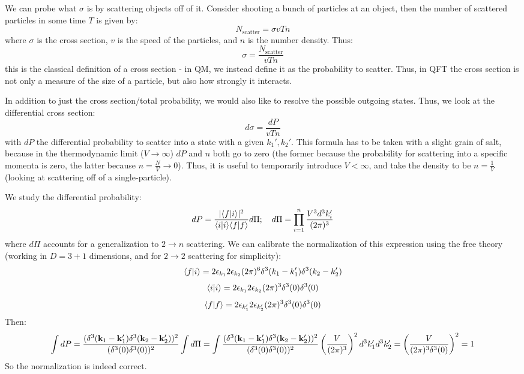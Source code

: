 We can probe what $\sigma$ is by scattering objects off of it. Consider shooting a bunch of particles at an object, then the number of scattered particles in some time $T$ is given by:
\begin{equation}
    N_{\text{scatter}} = \sigma v T n
\end{equation}
where $\sigma$ is the cross section, $v$ is the speed of the particles, and $n$ is the number density. Thus:
\begin{equation}
    \sigma = \frac{N_{\text{scatter}}}{vTn}
\end{equation}
this is the classical definition of a cross section - in QM, we instead define it as the probability to scatter. Thus, in QFT the cross section is not only a measure of the size of a particle, but also how strongly it interacts.

In addition to just the cross section/total probability, we would also like to resolve the possible outgoing states. Thus, we look at the differential cross section:
\begin{equation}
    d\sigma = \frac{dP}{vT n}
\end{equation}
with $dP$ the differential probability to scatter into a state with a given $k_1', k_2'$. This formula has to be taken with a slight grain of salt, because in the thermodynamic limit ($V \to \infty$) $dP$ and $n$ both go to zero (the former because the probability for scattering into a specific momenta is zero, the latter because $n = \frac{N}{V} \to 0$). Thus, it is useful to temporarily introduce $V < \infty$, and take the density to be $n = \frac{1}{V}$ (looking at scattering off of a single-particle).

We study the differential probability:
\begin{equation}
    dP = \frac{\lvert \langle f \lvert i \rangle \rvert^2}{\langle i \lvert i \rangle\langle f \lvert f \rangle}d\Pi; \quad d\Pi = \prod_{i=1}^n \frac{V^3 d^3k_i'}{(2\pi)^3}
\end{equation}
where $d\Pi$ accounts for a generalization to $2 \to n$ scattering. We can calibrate the normalization of this expression using the free theory (working in $D = 3 + 1$ dimensions, and for $2\to2$ scattering for simplicity):
\begin{equation}
    \langle f \lvert i \rangle = 2\epsilon_{k_1}2\epsilon_{k_2}(2\pi)^6\delta^3(k_1 - k_1')\delta^3(k_2 - k_2')
\end{equation}
\begin{equation}
    \langle i \lvert i \rangle = 2\epsilon_{k_1}2\epsilon_{k_2}(2\pi)^3\delta^3(0)\delta^3(0)
\end{equation}
\begin{equation}
    \langle f \lvert f \rangle = 2\epsilon_{k_1'}2\epsilon_{k_2'}(2\pi)^3\delta^3(0)\delta^3(0)
\end{equation}
Then:
\begin{equation}
    \int dP = \frac{(\delta^3(\mathbf{k}_1 - \mathbf{k}_1')\delta^3(\mathbf{k}_2 - \mathbf{k}_2'))^2}{(\delta^3(0)\delta^3(0))^2}\int d\Pi = \int\frac{(\delta^3(\mathbf{k}_1 - \mathbf{k}_1')\delta^3(\mathbf{k}_2 - \mathbf{k}_2'))^2}{(\delta^3(0)\delta^3(0))^2}\left(\frac{V}{(2\pi)^3}\right)^2 d^3k_1' d^3k_2' = \left(\frac{V}{(2\pi)^3\delta^3(0)}\right)^2 = 1
\end{equation}
So the normalization is indeed correct.

